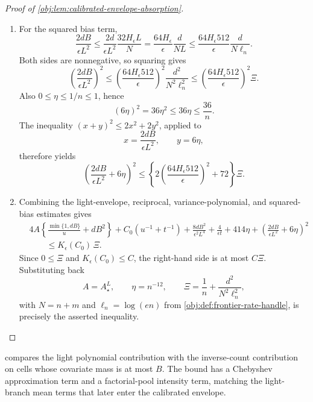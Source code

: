 \documentclass[11pt]{article}
\begin{document}
\begin{proof}[Proof of \cref{obj:lem:calibrated-envelope-absorption}]
\begin{enumerate}
\item For the squared bias term,
\[
\frac{2dB}{\epsilon L^2}
\le
\frac{2d}{\epsilon L^2}\frac{32H_\epsilon L}{N}
=
\frac{64H_\epsilon}{\epsilon}\frac{d}{NL}
\le
\frac{64H_\epsilon512}{\epsilon}\frac{d}{N\ell_n}.
\]
Both sides are nonnegative, so squaring gives
\[
\left(\frac{2dB}{\epsilon L^2}\right)^2
\le
\left(\frac{64H_\epsilon512}{\epsilon}\right)^2
\frac{d^2}{N^2\ell_n^2}
\le
\left(\frac{64H_\epsilon512}{\epsilon}\right)^2\Xi .
\]
Also \(0\le\eta\le1/n\le1\), hence
\[
(6\eta)^2=36\eta^2\le36\eta\le\frac{36}{n}.
\]
The inequality \((x+y)^2\le2x^2+2y^2\), applied to
\[
x=\frac{2dB}{\epsilon L^2},
\qquad
y=6\eta,
\]
therefore yields
\[
\left(\frac{2dB}{\epsilon L^2}+6\eta\right)^2
\le
\left\{
2\left(\frac{64H_\epsilon512}{\epsilon}\right)^2+72
\right\}\Xi .
\]

\item Combining the light-envelope, reciprocal, variance-polynomial, and squared-bias estimates gives
\[
\begin{aligned}
&4A\left\{\frac{\min\{1,dB\}}u+dB^2\right\}
+C_0(u^{-1}+t^{-1})
+\frac{8dB^2}{\epsilon^2L^4}
+\frac4{\epsilon t}
+414\eta
+\left(\frac{2dB}{\epsilon L^2}+6\eta\right)^2  \\
&\qquad\le
K_\epsilon(C_0)\,\Xi .
\end{aligned}
\]
Since \(0\le\Xi\) and \(K_\epsilon(C_0)\le C\), the right-hand side is at most \(C\Xi\). Substituting back
\[
A=A_\star^L,\qquad \eta=n^{-12},\qquad
\Xi=\frac1n+\frac{d^2}{N^2\ell_n^2},
\]
with \(N=n+m\) and \(\ell_n=\log(en)\) from \cref{obj:def:frontier-rate-handle}, is precisely the asserted inequality. %
\end{enumerate}
\end{proof}

 compares the light polynomial contribution with the inverse-count contribution on cells whose covariate mass is at most \(B\). The bound has a Chebyshev approximation term and a factorial-pool intensity term, matching the light-branch mean terms that later enter the calibrated envelope.
\end{document}
